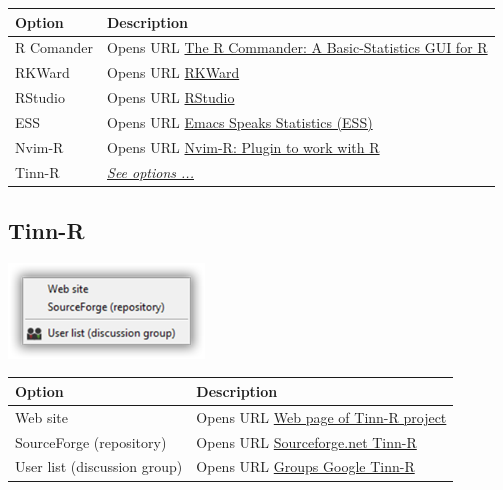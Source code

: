 \begin{scriptsize}
  \begin{tabularx}{\textwidth}{>{\hsize=0.3\hsize}X>{\hsize=0.7\hsize}X}\\
    \hline
    \textbf{Option} & \textbf{Description} \\
    \hline
    R Comander & Opens URL \href{http://socserv.socsci.mcmaster.ca/jfox/Misc/Rcmdr/index.html}
     {The R Commander: A Basic-Statistics GUI for R} \\
    RKWard & Opens URL \href{https://rkward.kde.org/}{RKWard} \\
    RStudio & Opens URL \href{http://www.rstudio.com/}{RStudio} \\
    \hdashline[1pt/1pt]
    ESS & Opens URL \href{http://ess.r-project.org/}{Emacs Speaks Statistics (ESS)} \\
    Nvim-R & Opens URL \href{http://www.vim.org/scripts/script.php?script\_id=2628}
     {Nvim-R: Plugin to work with R} \\
    Tinn-R & \textit{\href{\#menu\_web\_tinnr}{See options ...}} \\
    \hline
  \end{tabularx}
\end{scriptsize}


\hypertarget{menu_web_tinnr}{}
\subsection{Tinn-R}

\includegraphics[scale=0.50]{./res/menu_web_tinnr.png}\\


\begin{scriptsize}
  \begin{tabularx}{\textwidth}{>{\hsize=0.3\hsize}X>{\hsize=0.7\hsize}X}\\
    \hline
    \textbf{Option} & \textbf{Description} \\
    \hline
    Web site & Opens URL \href{https://tinn-r.org/en/}{Web page of Tinn-R project} \\
    SourceForge (repository) & Opens URL \href{http://sourceforge.net/projects/tinn-r}
     {Sourceforge.net Tinn-R} \\
    \hdashline[1pt/1pt]
    User list (discussion group) & Opens URL \href{https://groups.google.com/g/tinn-r}{Groups Google Tinn-R} \\
    \hline
  \end{tabularx}
\end{scriptsize}


